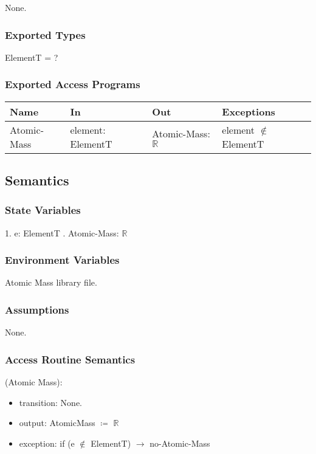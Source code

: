 \documentclass[12pt, titlepage]{article}
\begin{document}
None. 
\subsubsection{Exported Types}

ElementT = ?


\subsubsection{Exported Access Programs}

\begin{center}
\begin{tabular}{p{2cm} p{4cm} p{4cm} p{2cm}}
\hline
\textbf{Name} & \textbf{In} & \textbf{Out} & \textbf{Exceptions} \\
\hline
{Atomic-Mass} & element: ElementT & Atomic-Mass: $\mathbb{R}$ & element $\notin$ ElementT  \\
\hline
\end{tabular}
\end{center}

\subsection{Semantics}

\subsubsection{State Variables}

1. e: ElementT
. Atomic-Mass: $\mathbb{R}$
\subsubsection{Environment Variables}

Atomic Mass library file.

\subsubsection{Assumptions}

None.

\subsubsection{Access Routine Semantics}

\noindent (Atomic Mass):
\begin{itemize}
\item transition: None.
\item output:  AtomicMass $\coloneqq$  $\mathbb{R}$
\item exception: if (e $\notin$ ElementT) $\rightarrow$  no-Atomic-Mass
\end{itemize}
\end{document}

